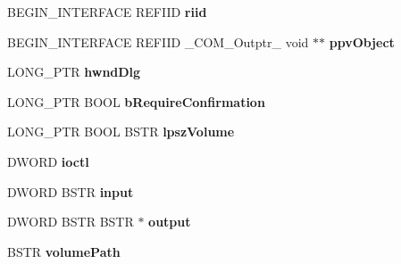 \begin{DoxyCompactItemize}
\item 
\mbox{\label{struct_i_gost_crypt_main_com_vtbl_a1dfc8d3510cfbebfdea8d0d9fb6d009f}} 
B\+E\+G\+I\+N\+\_\+\+I\+N\+T\+E\+R\+F\+A\+CE R\+E\+F\+I\+ID {\bfseries riid}
\item 
\mbox{\label{struct_i_gost_crypt_main_com_vtbl_a472100409da9c6ae7253584a79b5577f}} 
B\+E\+G\+I\+N\+\_\+\+I\+N\+T\+E\+R\+F\+A\+CE R\+E\+F\+I\+ID \+\_\+\+C\+O\+M\+\_\+\+Outptr\+\_\+ void $\ast$$\ast$ {\bfseries ppv\+Object}
\item 
\mbox{\label{struct_i_gost_crypt_main_com_vtbl_acb4ace36d52e1289a2d5399f7656adb6}} 
L\+O\+N\+G\+\_\+\+P\+TR {\bfseries hwnd\+Dlg}
\item 
\mbox{\label{struct_i_gost_crypt_main_com_vtbl_a0e75008c415b1c1f4443e4306f2ff909}} 
L\+O\+N\+G\+\_\+\+P\+TR B\+O\+OL {\bfseries b\+Require\+Confirmation}
\item 
\mbox{\label{struct_i_gost_crypt_main_com_vtbl_ae702417640744088740b23e0b9fce9cb}} 
L\+O\+N\+G\+\_\+\+P\+TR B\+O\+OL B\+S\+TR {\bfseries lpsz\+Volume}
\item 
\mbox{\label{struct_i_gost_crypt_main_com_vtbl_ae63ebb9085b95288183af6e6bed2ec22}} 
D\+W\+O\+RD {\bfseries ioctl}
\item 
\mbox{\label{struct_i_gost_crypt_main_com_vtbl_ab44bccf5e84110d003f58162d8094dff}} 
D\+W\+O\+RD B\+S\+TR {\bfseries input}
\item 
\mbox{\label{struct_i_gost_crypt_main_com_vtbl_a7d0bdfced49fad39eee50e1843578f51}} 
D\+W\+O\+RD B\+S\+TR B\+S\+TR $\ast$ {\bfseries output}
\item 
\mbox{\label{struct_i_gost_crypt_main_com_vtbl_a8bcc02d6d8c5326da60f0c7ae5f63102}} 
B\+S\+TR {\bfseries volume\+Path}
\item 
\mbox{\label{struct_i_gost_crypt_main_com_vtbl_aa6054b1e34569041ff2b42e740866aa5}} 
$$
\end{DoxyCompactItemize}
